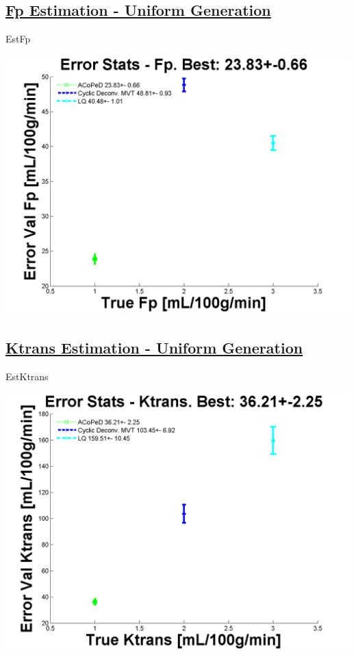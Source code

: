 \documentclass[english]{article}
\begin{document}
\graphicspath{ {D:\Dropbox\University\Msc\Thesis\Git\dce_development\Code\DCE_Perfusion\Run_Output\ } }
\subsection*{\underline{Fp Estimation - Uniform Generation}}

EstFp




\includegraphics[scale=0.7]{Est_Fp_Uniform.png}

\subsection*{\underline{Ktrans Estimation - Uniform Generation}}

EstKtrans




\includegraphics[scale=0.7]{Est_Ktrans_Uniform.png}
\end{document}

